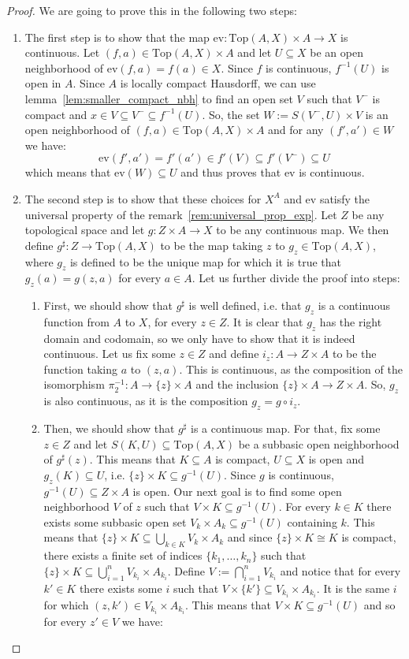 \begin{proof} We are going to prove this in the following two steps:
\begin{enumerate}
\item The first step is to show that the map $\mathrm{ev}:\mathrm{Top}(A,X)\times A\to X$ is continuous. Let $(f,a)\in\mathrm{Top}(A,X)\times A$ and let $U\subseteq X$ be an open neighborhood of $\mathrm{ev}(f,a)=f(a)\in X$. Since $f$ is continuous, $f^{-1}(U)$ is open in $A$. Since $A$ is locally compact Hausdorff, we can use lemma~\ref{lem:smaller_compact_nbh} to find an open set $V$ such that $V^-$ is compact and $x\in V\subseteq V^-\subseteq f^{-1}(U)$. So, the set $W:=S(V^-,U)\times V$ is an open neighborhood of $(f,a)\in\mathrm{Top}(A,X)\times A$ and for any $(f',a')\in W$ we have:
\[\mathrm{ev}(f',a')=f'(a')\in f'(V)\subseteq f'(V^-)\subseteq U\]
which means that $\mathrm{ev}(W)\subseteq U$ and thus proves that $\mathrm{ev}$ is continuous.
\item The second step is to show that these choices for $X^A$ and $\mathrm{ev}$ satisfy the universal property of the remark~\ref{rem:universal_prop_exp}. Let $Z$ be any topological space and let $g:Z\times A\to X$ to be any continuous map. We then define $g^{\sharp}:Z\to\mathrm{Top}(A,X)$ to be the map taking $z$ to $g_z\in\mathrm{Top}(A,X)$, where $g_z$ is defined to be the unique map for which it is true that $g_z(a)=g(z,a)$ for every $a\in A$. Let us further divide the proof into steps:
\begin{enumerate}
\item First, we should show that $g^{\sharp}$ is well defined, i.e. that $g_z$ is a continuous function from $A$ to $X$, for every $z\in Z$. It is clear that $g_z$ has the right domain and codomain, so we only have to show that it is indeed continuous. Let us fix some $z\in Z$ and define $i_z:A\to Z\times A$ to be the function taking $a$ to $(z,a)$. This is continuous, as the composition of the isomorphism $\pi_2^{-1}:A\to\{z\}\times A$ and the inclusion $\{z\}\times A\to Z\times A$. So, $g_z$ is also continuous, as it is the composition $g_z=g\circ i_z$.
\item Then, we should show that $g^{\sharp}$ is a continuous map. For that, fix some $z\in Z$ and let $S(K,U)\subseteq\mathrm{Top}(A,X)$ be a subbasic open neighborhood of $g^{\sharp}(z)$. This means that $K\subseteq A$ is compact, $U\subseteq X$ is open and $g_z(K)\subseteq U$, i.e. $\{z\}\times K\subseteq g^{-1}(U)$. Since $g$ is continuous, $g^{-1}(U)\subseteq Z\times A$ is open. Our next goal is to find some open neighborhood $V$ of $z$ such that $V\times K\subseteq g^{-1}(U)$. For every $k\in K$ there exists some subbasic open set $V_k\times A_k\subseteq g^{-1}(U)$ containing $k$. This means that $\{z\}\times K\subseteq\bigcup_{k\in K}V_k\times A_k$ and since $\{z\}\times K\cong K$ is compact, there exists a finite set of indices $\{k_1,\ldots,k_n\}$ such that $\{z\}\times K\subseteq\bigcup_{i=1}^nV_{k_i}\times A_{k_i}$. Define $V:=\bigcap_{i=1}^nV_{k_i}$ and notice that for every $k'\in K$ there exists some $i$ such that $V\times\{k'\}\subseteq V_{k_i}\times A_{k_i}$. It is the same $i$ for which $(z,k')\in V_{k_i}\times A_{k_i}$. This means that $V\times K\subseteq g^{-1}(U)$ and so for every $z'\in V$ we have:

\end{enumerate}
\end{enumerate}
\end{proof}
